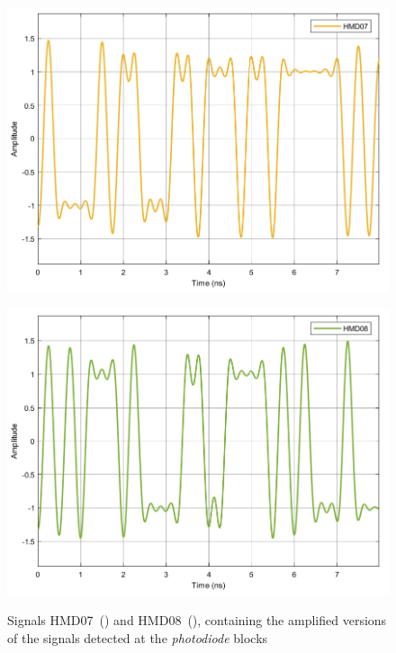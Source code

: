 	\begin{figure}[H]
	\centering
	\begin{minipage}{0.45\textwidth}
		\centering
		\includegraphics[width=1\textwidth]		
		{./sdf/m_qam_system/figures/simulations/01_noISI/HMD07.pdf}
		\subcaption{}\label{fig:ISIhmd07}
	\end{minipage}
	\begin{minipage}{0.45\textwidth}
		\centering
		\includegraphics[width=1\textwidth]
		{sdf/m_qam_system/figures/simulations/01_noISI/HMD08.pdf}
		\subcaption{}\label{fig:ISIhmd08}
	\end{minipage}
	\caption{Signals HMD07~() and 
		HMD08~(), 
		containing the amplified versions of the signals detected at the 
		\textit{photodiode} blocks}\label{fig:ISIhmd0708}
\end{figure}


